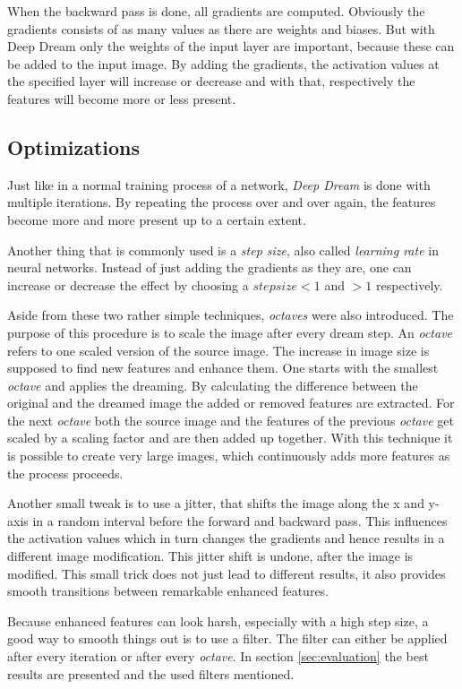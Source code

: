 When the backward pass is done, all gradients are computed.
Obviously the gradients consists of as many values as there are weights and biases.
But with Deep Dream only the weights of the input layer are important, because these can be added to the input image.
By adding the gradients, the activation values at the specified layer will increase or decrease and with that, respectively the features will become more or less present.

\subsection{Optimizations}
\label{sec:optimizations}
Just like in a normal training process of a network, \emph{Deep Dream} is done with multiple iterations.
By repeating the process over and over again, the features become more and more present up to a certain extent.

Another thing that is commonly used is a \emph{step size}, also called \emph{learning rate} in neural networks.
Instead of just adding the gradients as they are, one can increase or decrease the effect by choosing a $step size < 1$ and $> 1$ respectively.

Aside from these two rather simple techniques, \emph{octaves} were also introduced.
The purpose of this procedure is to scale the image after every dream step.
An \textit{octave} refers to one scaled version of the source image.
The increase in image size is supposed to find new features and enhance them.
One starts with the smallest \textit{octave} and applies the dreaming.
By calculating the difference between the original and the dreamed image the added or removed features are extracted.
For the next \textit{octave} both the source image and the features of the previous \textit{octave} get scaled by a scaling factor and are then added up together.
With this technique it is possible to create very large images, which continuously adds more features as the process proceeds.

 
Another small tweak is to use a jitter, that shifts the image along the x and y-axis in a random interval before the forward and backward pass.
This influences the activation values which in turn changes the gradients and hence results in a different image modification.
This jitter shift is undone, after the image is modified.
This small trick does not just lead to different results, it also provides smooth transitions between remarkable enhanced features.

Because enhanced features can look harsh, especially with a high step size, a good way to smooth things out is to use a filter. 
The filter can either be applied after every iteration or after every \textit{octave}.
In section \ref{sec:evaluation} the best results are presented and the used filters mentioned.


